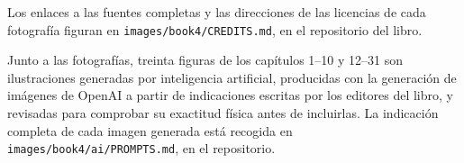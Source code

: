 Los enlaces a las fuentes completas y las direcciones de las licencias
de cada fotografía figuran en \texttt{images/book4/CREDITS.md}, en el
repositorio del libro.

\bigskip
Junto a las fotografías, treinta figuras de los capítulos 1--10 y
12--31 son ilustraciones generadas por inteligencia artificial,
producidas con la generación de imágenes de OpenAI a partir de
indicaciones escritas por los editores del libro, y revisadas para
comprobar su exactitud física antes de incluirlas. La indicación
completa de cada imagen generada está recogida en
\texttt{images/book4/ai/PROMPTS.md}, en el repositorio.
\clearpage
